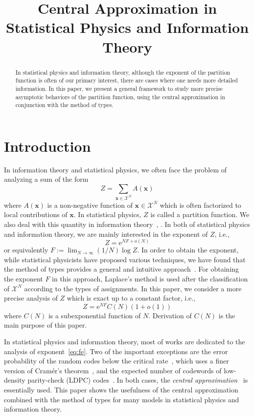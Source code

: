 \documentclass[conference,twocolumns]{IEEEtran}
\title{Central Approximation in Statistical Physics and Information Theory}
\author{
\IEEEauthorblockN{Ryuhei Mori and Toshiyuki Tanaka}
\IEEEauthorblockA{
Graduate School of Informatics,
Kyoto University\\
Kyoto, 606--8501, Japan\\
Email: rmori@sys.i.kyoto-u.ac.jp, tt@i.kyoto-u.ac.jp
}
}
\theoremstyle{plain}
\begin{document}
\maketitle
\begin{abstract}
In statistical physics and information theory, although the exponent of the partition function is often of our primary interest, 
there are cases where one needs more detailed information. 
In this paper, we present a general framework 
to study more precise asymptotic behaviors of the partition function, 
using the central approximation in conjunction with the method of types. 
\end{abstract}

\section{Introduction}
In information theory and statistical physics, we often face the problem of analyzing a sum of the form
\begin{equation*}
Z = \sum_{\bm{x}\in\mathcal{X}^N} A(\bm{x})
\end{equation*}
where $A(\bm{x})$ is a non-negative function of $\bm{x}\in\mathcal{X}^N$ which is often factorized to local contributions of $\bm{x}$.
In statistical physics, $Z$ is called a partition function.
We also deal with this quantity in information theory~\cite{mezard2009ipa}, \cite{tanaka2002statistical}.
In both of statistical physics and information theory, we are mainly interested in the exponent of $Z$, i.e.,
\begin{equation}\label{eq:fe}
Z = \mathrm{e}^{NF+o(N)}
\end{equation}
or equivalently
$F:=\lim_{N\to\infty}(1/N)\log Z$.
In order to obtain the exponent, while statistical physicists have proposed various techniques,
we have found that the method of types provides a general and intuitive approach~\cite{mori2011connection}.
For obtaining the exponent $F$ in this approach, Laplace's method is used after the classification of $\mathcal{X}^N$ according to the types of assignments.
In this paper, we consider a more precise analysis of $Z$ which is exact up to a constant factor, i.e.,
\begin{equation}\label{eq:pf}
Z = \mathrm{e}^{NF}C(N)(1+o(1))
\end{equation}
where $C(N)$ is a subexponential function of $N$.
Derivation of $C(N)$ is the main purpose of this paper.

In statistical physics and information theory, most of works are dedicated to the analysis of exponent~\eqref{eq:fe}.
Two of the important exceptions are the error probability of the random codes below the critical rate~\cite{gallager1973random}, which uses
a finer version of Cram{\'e}r's theorem~\cite{bahadur1960deviations},
and
the expected number of codewords of low-density parity-check (LDPC) codes~\cite{1715529}.
In both cases, the {\it central approximation}~\cite{flajolet2009analytic} is essentially used.
This paper shows the usefulness of the central approximation combined with the method of types for many models in statistical physics and information theory.
\end{document}

